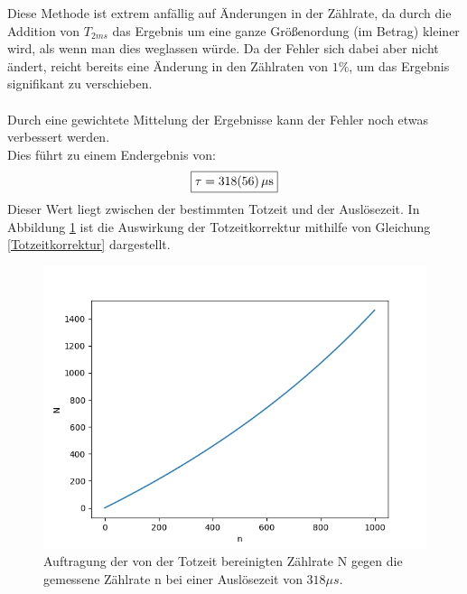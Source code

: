 \documentclass[12pt,a4paper]{article}
\begin{document}
Diese Methode ist extrem anfällig auf Änderungen in der Zählrate, da durch die Addition von $T_{2ms}$ das Ergebnis um eine ganze Größenordung (im Betrag) kleiner wird, als wenn man dies weglassen würde. Da der Fehler sich dabei aber nicht ändert, reicht bereits eine Änderung in den Zählraten von $1\%$, um das Ergebnis signifikant zu verschieben.\\
\\
Durch eine gewichtete Mittelung der Ergebnisse kann der Fehler noch etwas verbessert werden.\\
Dies führt zu einem Endergebnis von:
\begin{equation}
\boxed{\tau = \SI{318\pm 56}{\mu s}}
\end{equation}
Dieser Wert liegt zwischen der bestimmten Totzeit und der Auslösezeit.
In Abbildung \ref{fig:Totzeit} ist die Auswirkung der Totzeitkorrektur mithilfe von Gleichung \ref{Totzeitkorrektur} dargestellt.

\begin{figure}
\centering
\includegraphics[scale=0.9]{Bilder/Totzeitkorrektur.png}
\caption{Auftragung der von der Totzeit bereinigten Zählrate N gegen die gemessene Zählrate n bei einer Auslösezeit von $318\mu s$.}
\label{fig:Totzeit}
\end{figure}
\end{document}
